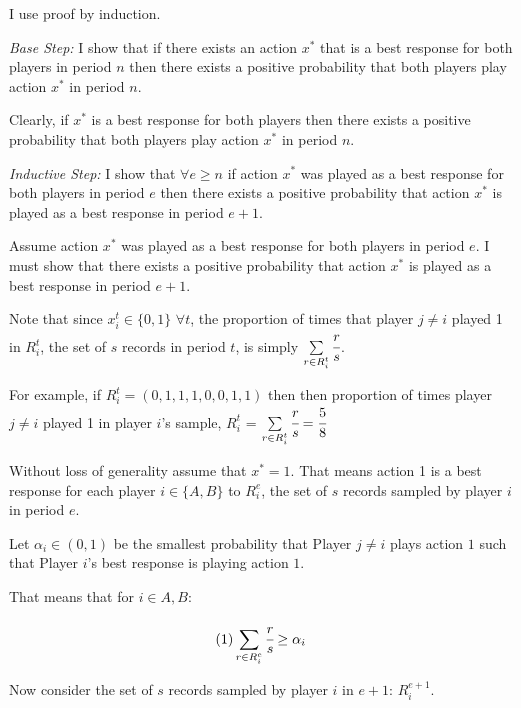 \documentclass{article}
\begin{document}
\vskip12pt

I use proof by induction.

\vskip12pt

\textit{Base Step:} I show that if there exists an action $x^*$ that is a best response for both players in period $n$ then there exists a positive probability that both players play action $x^*$ in period $n$.

\vskip6pt

Clearly, if $x^*$ is a best response for both players then there exists a positive probability that both players play action $x^*$ in period $n$.

\vskip12pt

\textit{Inductive Step:} I show that $\forall e \geq n$ if action $x^*$ was played as a best response for both players in period $e$ then there exists a positive probability that action $x^*$ is played as a best response in period $e+1$.

\vskip6pt

Assume action $x^*$ was played as a best response for both players in period $e$. I must show that there exists a positive probability that action $x^*$ is played as a best response in period $e+1$.

\vskip6pt

Note that since $x_i^t \in \{0,1\}$ \hspace{4pt} $\forall t$, the proportion of times that player $j \neq i$ played 1 in $R_i^t$, the set of $s$ records in period $t$, is simply $\sum\limits_{r \in R_i^t} \cfrac{r}{s}$.

For example, if $R_i^t = (0,1,1,1,0,0,1,1)$ then then proportion of times player $j \neq i$ played 1 in player $i$'s sample, $R_i^t$ = $\sum\limits_{r \in R_i^t} \cfrac{r}{s} = \cfrac{5}{8} $

Without loss of generality assume that $x^{*}=1$. That means action 1 is a best response for each player $i \in \{A,B\}$ to $R_i^{e}$, the set of $s$ records sampled by player $i$ in period $e$.

\vskip6pt

Let $\alpha_i \in (0,1)$ be the smallest probability that Player $j \neq i$ plays action $1$ such that Player $i$'s best response is playing action $1$.

That means that for $i \in {A, B}$:

$$ (1) \sum\limits_{r \in R_i^{e}} \cfrac{r}{s} \geq \alpha_i$$

Now consider the set of $s$ records sampled by player $i$ in $e+1$: $R_i^{e+1}$.
\end{document}
